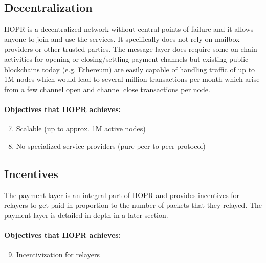 \subsection{Decentralization}
HOPR is a decentralized network without central points of failure and it allows anyone to join and use the services. It specifically does not rely on mailbox providers or other trusted parties. The message layer does require some on-chain activities for opening or closing/settling payment channels but existing public blockchains today (e.g. Ethereum) are easily capable of handling traffic of up to 1M nodes which would lead to several million transactions per month which arise from a few channel open and channel close transactions per node.

\paragraph{Objectives that HOPR achieves:}

\begin{enumerate}\setcounter{enumi}{6}
    \item Scalable (up to approx. 1M active nodes)
    \item No specialized service providers (pure peer-to-peer protocol)
\end{enumerate}

\subsection{Incentives}
The payment layer is an integral part of HOPR and provides incentives for relayers to get paid in proportion to the number of packets that they relayed. The payment layer is detailed in depth in a later section.

\paragraph{Objectives that HOPR achieves:}

\begin{enumerate}\setcounter{enumi}{8}
    \item Incentivization for relayers
\end{enumerate}